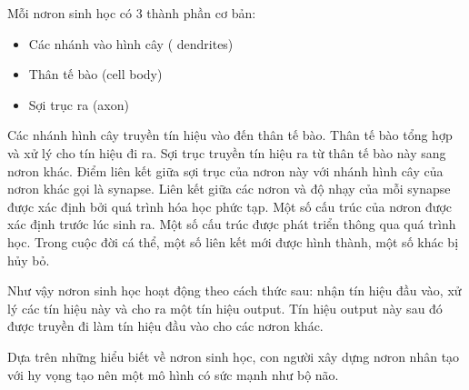 Mỗi nơron sinh học có 3 thành phần cơ bản: 
\begin{itemize}
\item Các nhánh vào hình cây ( dendrites) 
\item Thân tế bào (cell body) 
\item Sợi trục ra (axon) 
\end{itemize}

Các nhánh hình cây truyền tín hiệu vào đến thân tế bào. Thân tế bào tổng hợp và xử lý cho tín hiệu đi ra. Sợi trục truyền tín hiệu ra từ thân tế bào này sang nơron khác. Điểm liên kết giữa sợi trục của nơron này với nhánh hình cây của nơron khác gọi là synapse. Liên kết giữa các nơron và độ nhạy của mỗi synapse được xác định bởi quá trình hóa học phức tạp. Một số cấu trúc của nơron được xác định trước lúc sinh ra. Một số cấu trúc được phát triển thông qua quá trình học. Trong cuộc đời cá thể, một số liên kết mới được hình thành, một số khác bị hủy bỏ. 

Như vậy nơron sinh học hoạt động theo cách thức sau: nhận tín hiệu đầu vào, xử lý các tín hiệu này và cho ra một tín hiệu output. Tín hiệu output này sau đó được truyền đi làm tín hiệu đầu vào cho các nơron khác.

Dựa trên những hiểu biết về nơron sinh học, con người xây dựng nơron nhân tạo với hy vọng tạo nên một mô hình có sức mạnh như bộ não.

